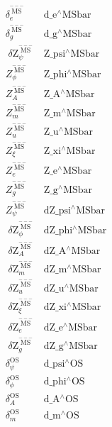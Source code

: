 \documentclass[../FeynCalcManual.tex]{subfiles}
\begin{document}
\begin{dmath*}
\begin{array}{cc}
 \delta _e^{\overset{---}{\text{MS}}} & \;\text{d$\_$e${}^{\wedge}$MSbar} \\
 \delta _g^{\overset{---}{\text{MS}}} & \;\text{d$\_$g${}^{\wedge}$MSbar} \\
 \;\text{$\delta $Z}_{\psi }^{\overset{---}{\text{MS}}} & \;\text{Z$\_$psi${}^{\wedge}$MSbar} \\
 Z_{\phi }^{\overset{---}{\text{MS}}} & \;\text{Z$\_$phi${}^{\wedge}$MSbar} \\
 Z_A^{\overset{---}{\text{MS}}} & \;\text{Z$\_$A${}^{\wedge}$MSbar} \\
 Z_m^{\overset{---}{\text{MS}}} & \;\text{Z$\_$m${}^{\wedge}$MSbar} \\
 Z_u^{\overset{---}{\text{MS}}} & \;\text{Z$\_$u${}^{\wedge}$MSbar} \\
 Z_{\xi }^{\overset{---}{\text{MS}}} & \;\text{Z$\_$xi${}^{\wedge}$MSbar} \\
 Z_e^{\overset{---}{\text{MS}}} & \;\text{Z$\_$e${}^{\wedge}$MSbar} \\
 Z_g^{\overset{---}{\text{MS}}} & \;\text{Z$\_$g${}^{\wedge}$MSbar} \\
 Z_{\psi }^{\overset{---}{\text{MS}}} & \;\text{dZ$\_$psi${}^{\wedge}$MSbar} \\
 \;\text{$\delta $Z}_{\phi }^{\overset{---}{\text{MS}}} & \;\text{dZ$\_$phi${}^{\wedge}$MSbar} \\
 \;\text{$\delta $Z}_A^{\overset{---}{\text{MS}}} & \;\text{dZ$\_$A${}^{\wedge}$MSbar} \\
 \;\text{$\delta $Z}_m^{\overset{---}{\text{MS}}} & \;\text{dZ$\_$m${}^{\wedge}$MSbar} \\
 \;\text{$\delta $Z}_u^{\overset{---}{\text{MS}}} & \;\text{dZ$\_$u${}^{\wedge}$MSbar} \\
 \;\text{$\delta $Z}_{\xi }^{\overset{---}{\text{MS}}} & \;\text{dZ$\_$xi${}^{\wedge}$MSbar} \\
 \;\text{$\delta $Z}_e^{\overset{---}{\text{MS}}} & \;\text{dZ$\_$e${}^{\wedge}$MSbar} \\
 \;\text{$\delta $Z}_g^{\overset{---}{\text{MS}}} & \;\text{dZ$\_$g${}^{\wedge}$MSbar} \\
 \delta _{\psi }^{\text{OS}} & \;\text{d$\_$psi${}^{\wedge}$OS} \\
 \delta _{\phi }^{\text{OS}} & \;\text{d$\_$phi${}^{\wedge}$OS} \\
 \delta _A^{\text{OS}} & \;\text{d$\_$A${}^{\wedge}$OS} \\
 \delta _m^{\text{OS}} & \;\text{d$\_$m${}^{\wedge}$OS} \\

\end{array}
\end{dmath*}
\end{document}
